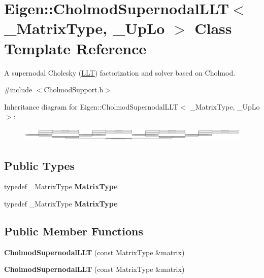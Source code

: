 \hypertarget{class_eigen_1_1_cholmod_supernodal_l_l_t}{}\section{Eigen\+:\+:Cholmod\+Supernodal\+L\+LT$<$ \+\_\+\+Matrix\+Type, \+\_\+\+Up\+Lo $>$ Class Template Reference}
\label{class_eigen_1_1_cholmod_supernodal_l_l_t}


A supernodal Cholesky (\hyperlink{group___cholesky___module_class_eigen_1_1_l_l_t}{L\+LT}) factorization and solver based on Cholmod.  




{\ttfamily \#include $<$Cholmod\+Support.\+h$>$}

Inheritance diagram for Eigen\+:\+:Cholmod\+Supernodal\+L\+LT$<$ \+\_\+\+Matrix\+Type, \+\_\+\+Up\+Lo $>$\+:\begin{figure}[H]
\begin{center}
\leavevmode
\includegraphics[height=0.628366cm]{class_eigen_1_1_cholmod_supernodal_l_l_t}
\end{center}
\end{figure}
\subsection*{Public Types}
\begin{DoxyCompactItemize}
\item 
\mbox{\label{class_eigen_1_1_cholmod_supernodal_l_l_t_a65e46c3ca6023d947706dac78173e916}} 
typedef \+\_\+\+Matrix\+Type {\bfseries Matrix\+Type}
\item 
\mbox{\label{class_eigen_1_1_cholmod_supernodal_l_l_t_a65e46c3ca6023d947706dac78173e916}} 
typedef \+\_\+\+Matrix\+Type {\bfseries Matrix\+Type}
\end{DoxyCompactItemize}
\subsection*{Public Member Functions}
\begin{DoxyCompactItemize}
\item 
\mbox{\label{class_eigen_1_1_cholmod_supernodal_l_l_t_acd892066850e8ee5fbdc33d40f006cb3}} 
{\bfseries Cholmod\+Supernodal\+L\+LT} (const Matrix\+Type \&matrix)
\item 
\mbox{\label{class_eigen_1_1_cholmod_supernodal_l_l_t_acd892066850e8ee5fbdc33d40f006cb3}} 
{\bfseries Cholmod\+Supernodal\+L\+LT} (const Matrix\+Type \&matrix)
\end{DoxyCompactItemize}
